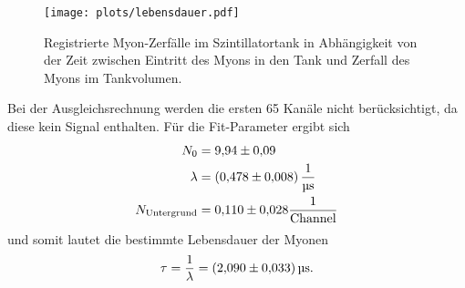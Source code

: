 \begin{figure}[H]
  \centering
  \texttt{[image: plots/lebensdauer.pdf]}
  \caption{Registrierte Myon-Zerfälle im Szintillatortank in Abhängigkeit von der Zeit zwischen Eintritt des Myons in den Tank und Zerfall des Myons im Tankvolumen.}
  \label{fig:data}
\end{figure}
Bei der Ausgleichsrechnung werden die ersten 65 Kanäle nicht berücksichtigt, da diese kein Signal enthalten. Für die Fit-Parameter ergibt sich
\begin{align*}
  N_0 &= \num{9.94 \pm 0.09} \\
  \lambda &= \SI{0.478 \pm 0.008}{\per\micro\second} \\
  N_\mathrm{Untergrund} &= \num{0.11 \pm 0.028} \frac{1}{\mathrm{Channel}}
\end{align*}
und somit lautet die bestimmte Lebensdauer der Myonen
\begin{equation*}
  \tau = \frac{1}{\lambda} = \SI{2.09 \pm 0.033}{\micro\second}.
\end{equation*}

